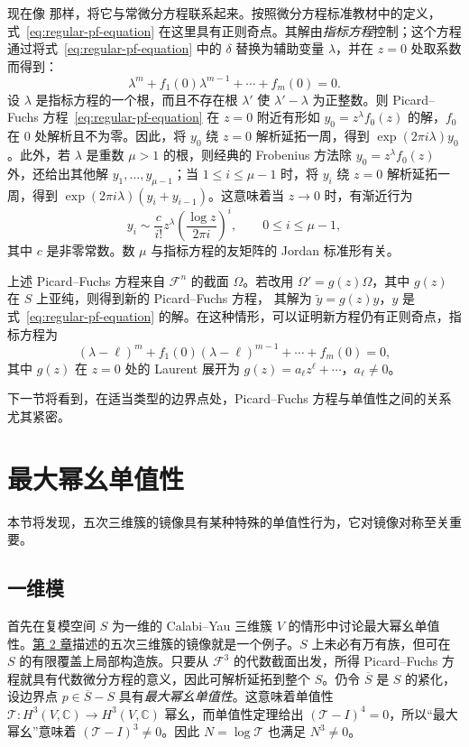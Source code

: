 现在像  那样，将它与常微分方程联系起来。按照微分方程标准教材中的定义，式~\eqref{eq:regular-pf-equation} 在这里具有正则奇点。其解由\emph{指标方程}控制；这个方程通过将式~\eqref{eq:regular-pf-equation} 中的 $\delta$ 替换为辅助变量 $\lambda$，并在 $z=0$ 处取系数而得到：
\[
\lambda^m+f_1(0)\lambda^{m-1}+\cdots+f_m(0)=0.
\]
设 $\lambda$ 是指标方程的一个根，而且不存在根 $\lambda'$ 使 $\lambda'-\lambda$ 为正整数。则 Picard--Fuchs 方程~\eqref{eq:regular-pf-equation} 在 $z=0$ 附近有形如 $y_0=z^\lambda f_0(z)$ 的解，$f_0$ 在 $0$ 处解析且不为零。因此，将 $y_0$ 绕 $z=0$ 解析延拓一周，得到 $\exp(2\pi i\lambda)y_0$。此外，若 $\lambda$ 是重数 $\mu>1$ 的根，则经典的 Frobenius 方法除 $y_0=z^\lambda f_0(z)$ 外，还给出其他解 $y_1,\ldots,y_{\mu-1}$；当 $1\leq i\leq\mu-1$ 时，将 $y_i$ 绕 $z=0$ 解析延拓一周，得到 $\exp(2\pi i\lambda)(y_i+y_{i-1})$。这意味着当 $z\to0$ 时，有渐近行为
\[
y_i\sim\frac c{i!}z^\lambda
\left(\frac{\log z}{2\pi i}\right)^i,
\qquad0\leq i\leq\mu-1,
\]
其中 $c$ 是非零常数。数 $\mu$ 与指标方程的友矩阵的 Jordan 标准形有关。

上述 Picard--Fuchs 方程来自 $\mathcal F^n$ 的截面 $\Omega$。若改用 $\Omega'=g(z)\Omega$，其中 $g(z)$ 在 $S$ 上亚纯，则得到新的 Picard--Fuchs 方程，
其解为 $\widetilde y=g(z)y$，$y$ 是式~\eqref{eq:regular-pf-equation} 的解。在这种情形，可以证明新方程仍有正则奇点，指标方程为
\[
(\lambda-\ell)^m+f_1(0)(\lambda-\ell)^{m-1}
+\cdots+f_m(0)=0,
\]
其中 $g(z)$ 在 $z=0$ 处的 Laurent 展开为 $g(z)=a_\ell z^\ell+\cdots$，$a_\ell\ne0$。

下一节将看到，在适当类型的边界点处，Picard--Fuchs 方程与单值性之间的关系尤其紧密。

\section{最大幂幺单值性}\label{sec:maximal-unipotent}

本节将发现，五次三维簇的镜像具有某种特殊的单值性行为，它对镜像对称至关重要。

\subsection{一维模}\label{subsec:one-dimensional-mum}

首先在复模空间 $S$ 为一维的 Calabi--Yau 三维簇 $V$ 的情形中讨论最大幂幺单值性。\hyperref[chap:quintic]{第 2 章}描述的五次三维簇的镜像就是一个例子。$S$ 上未必有万有族，但可在 $S$ 的有限覆盖上局部构造族。只要从 $\mathcal F^3$ 的代数截面出发，所得 Picard--Fuchs 方程就具有代数微分方程的意义，因此可解析延拓到整个 $S$。仍令 $\overline S$ 是 $S$ 的紧化，设边界点 $p\in\overline S-S$ 具有\emph{最大幂幺单值性}。这意味着单值性 $\mathcal T:H^3(V,\mathbb C)\to H^3(V,\mathbb C)$ 幂幺，而单值性定理给出 $(\mathcal T-I)^4=0$，所以“最大幂幺”意味着 $(\mathcal T-I)^3\ne0$。因此 $N=\log\mathcal T$ 也满足 $N^3\ne0$。

